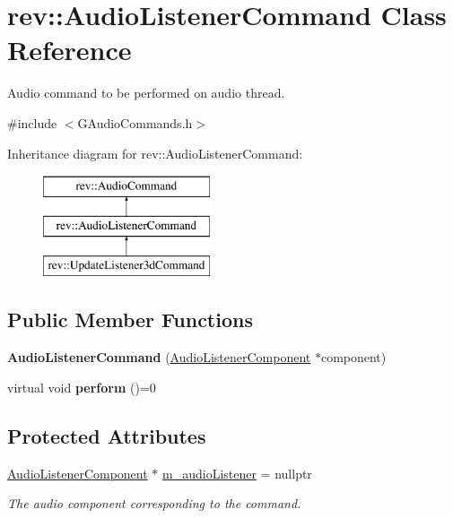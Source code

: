 \hypertarget{classrev_1_1_audio_listener_command}{}\section{rev\+::Audio\+Listener\+Command Class Reference}
\label{classrev_1_1_audio_listener_command}


Audio command to be performed on audio thread.  




{\ttfamily \#include $<$G\+Audio\+Commands.\+h$>$}

Inheritance diagram for rev\+::Audio\+Listener\+Command\+:\begin{figure}[H]
\begin{center}
\leavevmode
\includegraphics[height=3.000000cm]{classrev_1_1_audio_listener_command}
\end{center}
\end{figure}
\subsection*{Public Member Functions}
\begin{DoxyCompactItemize}
\item 
\mbox{\label{classrev_1_1_audio_listener_command_a3720637782296a14bcd66e15dc0debad}} 
{\bfseries Audio\+Listener\+Command} (\mbox{\hyperlink{classrev_1_1_audio_listener_component}{Audio\+Listener\+Component}} $\ast$component)
\item 
\mbox{\label{classrev_1_1_audio_listener_command_a380de816f7b4a8c4a0905dfa141e9802}} 
virtual void {\bfseries perform} ()=0
\end{DoxyCompactItemize}
\subsection*{Protected Attributes}
\begin{DoxyCompactItemize}
\item 
\mbox{\label{classrev_1_1_audio_listener_command_a5343f881434b80d4e82681e3cc1c5568}} 
\mbox{\hyperlink{classrev_1_1_audio_listener_component}{Audio\+Listener\+Component}} $\ast$ \mbox{\hyperlink{classrev_1_1_audio_listener_command_a5343f881434b80d4e82681e3cc1c5568}{m\+\_\+audio\+Listener}} = nullptr
\begin{DoxyCompactList}\small\item\em The audio component corresponding to the command. \end{DoxyCompactList}\end{DoxyCompactItemize}


